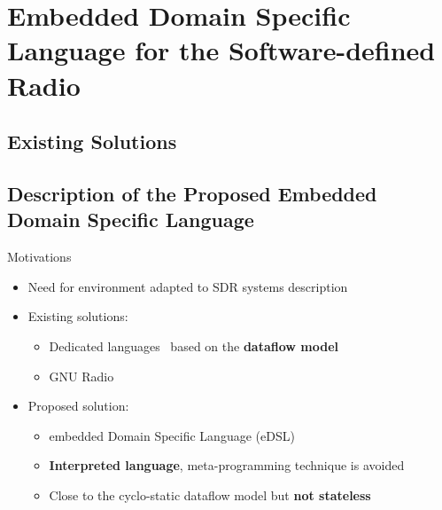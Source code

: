 
\section[eDSL for the SDR]{Embedded Domain Specific Language for the Software-defined Radio}

\subsection[Existing Solutions]{Existing Solutions}

\subsection[Proposed eDSL]{Description of the Proposed Embedded Domain Specific Language}

\begin{frame}{Motivations}
  \begin{itemize}
    \item Need for environment adapted to SDR systems description
    \vspace{0.1cm}
    \item<2-> Existing solutions:
    \begin{itemize}
      \item Dedicated languages~\cite{Amarasinghe2005,DeOliveiraCastro2017} based on the \textbf{dataflow model}
      \item GNU Radio~\cite{GNURadio}
    \end{itemize}
    \vspace{0.1cm}
    \item<3-> Proposed solution:
    \begin{itemize}
      \item \Cxx embedded Domain Specific Language (eDSL)
      \item \textbf{Interpreted language}, meta-programming technique is avoided
      \item Close to the cyclo-static dataflow model but \textbf{not stateless}
    \end{itemize}
  \end{itemize}
  \vfill
  \vspace{0.35cm}
\end{frame}

